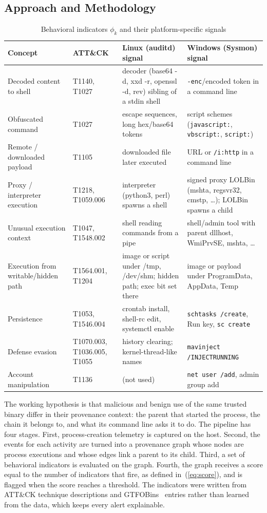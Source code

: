 \documentclass[conference]{IEEEtran}
\begin{document}
\subsection{Approach and Methodology}
\begin{table}[!t]
\caption{Behavioral indicators $\phi_k$ and their platform-specific signals}
\label{tab:indicators}
\centering\footnotesize
\begin{tabular}{p{3.0cm}p{1.9cm}p{5.2cm}p{5.6cm}}
\toprule
\textbf{Concept} & \textbf{ATT\&CK} & \textbf{Linux (auditd) signal} & \textbf{Windows (Sysmon) signal}\\
\midrule
Decoded content to shell & T1140, T1027 & decoder (base64 -d, xxd -r, openssl -d, rev) sibling of a stdin shell & \texttt{-enc}/encoded token in a command line\\
Obfuscated command & T1027 & escape sequences, long hex/base64 tokens & script schemes (\texttt{javascript:}, \texttt{vbscript:}, \texttt{script:})\\
Remote / downloaded payload & T1105 & downloaded file later executed & URL or \texttt{/i:http} in a command line\\
Proxy / interpreter execution & T1218, T1059.006 & interpreter (python3, perl) spawns a shell & signed proxy LOLBin (mshta, regsvr32, cmstp, \dots); LOLBin spawns a child\\
Unusual execution context & T1047, T1548.002 & shell reading commands from a pipe & shell/admin tool with parent dllhost, WmiPrvSE, mshta, \dots\\
Execution from writable/hidden path & T1564.001, T1204 & image or script under /tmp, /dev/shm; hidden path; exec bit set there & image or payload under ProgramData, AppData, Temp\\
Persistence & T1053, T1546.004 & crontab install, shell-rc edit, systemctl enable & \texttt{schtasks /create}, Run key, \texttt{sc create}\\
Defense evasion & T1070.003, T1036.005, T1055 & history clearing; kernel-thread-like names & \texttt{mavinject /INJECTRUNNING}\\
Account manipulation & T1136 & (not used) & \texttt{net user /add}, admin group add\\
\bottomrule
\end{tabular}
\end{table}

The working hypothesis is that malicious and benign use of the same trusted
binary differ in their provenance context: the parent that started the
process, the chain it belongs to, and what its command line asks it to do.
The pipeline has four stages. First, process-creation telemetry is captured
on the host. Second, the events for each activity are turned into a
provenance graph whose nodes are process executions and whose edges link a
parent to its child. Third, a set of behavioral indicators is evaluated on
the graph. Fourth, the graph receives a score equal to the number of
indicators that fire, as defined in~(\ref{eq:score}), and is flagged when
the score reaches a threshold. The indicators were written from ATT\&CK
technique descriptions and GTFOBins~\cite{gtfobins} entries rather than
learned from the data, which keeps every alert explainable.
\end{document}

